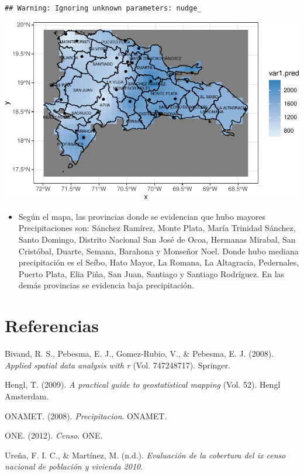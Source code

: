 \documentclass[11pt,]{article}
\providecommand{\tightlist}{%
\setlength{\itemsep}{0pt}\setlength{\parskip}{0pt}}
\begin{document}
\begin{verbatim}
## Warning: Ignoring unknown parameters: nudge_
\end{verbatim}

\includegraphics{proyecto_files/figure-latex/unnamed-chunk-37-1.pdf}

\begin{itemize}
\tightlist
\item
  Según el mapa, las provincias donde se evidencian que hubo mayores
  Precipitaciones son: Sánchez Ramírez, Monte Plata, María Trinidad
  Sánchez, Santo Domingo, Distrito Nacional San José de Ocoa, Hermanas
  Mirabal, San Cristóbal, Duarte, Semana, Barahona y Monseñor Noel.
  Donde hubo mediana precipitación es el Seíbo, Hato Mayor, La Romana,
  La Altagracia, Pedernales, Puerto Plata, Elia Piña, San Juan, Santiago
  y Santiago Rodríguez. En las demás provincias se evidencia baja
  precipitación.
\end{itemize}

\section*{Referencias}\label{referencias}

\hypertarget{refs}{}
\hypertarget{ref-bivand2008applied}{}
Bivand, R. S., Pebesma, E. J., Gomez-Rubio, V., \& Pebesma, E. J.
(2008). \emph{Applied spatial data analysis with r} (Vol. 747248717).
Springer.

\hypertarget{ref-hengl2009practical}{}
Hengl, T. (2009). \emph{A practical guide to geostatistical mapping}
(Vol. 52). Hengl Amsterdam.

\hypertarget{ref-onamet2008precipitacion}{}
ONAMET. (2008). \emph{Precipitacion}. ONAMET.

\hypertarget{ref-one2012censo}{}
ONE. (2012). \emph{Censo}. ONE.

\hypertarget{ref-urenaevaluacion}{}
Ureña, F. I. C., \& Martínez, M. (n.d.). \emph{Evaluación de la
cobertura del ix censo nacional de población y vivienda 2010}.




\newpage
\singlespacing 
\end{document}
